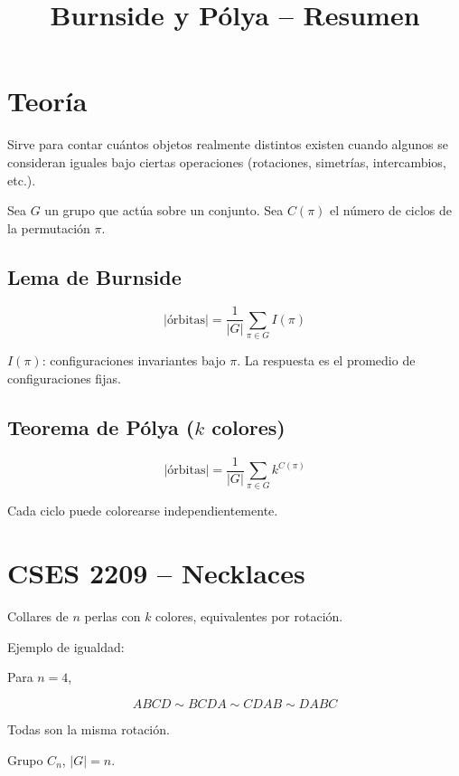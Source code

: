 \documentclass[10pt,twocolumn]{article}
\begin{document}
\title{\vspace{-0.5cm}Burnside y Pólya -- Resumen}
\date{}
\maketitle
\vspace{-0.5cm}

\section*{Teoría}

Sirve para contar cuántos objetos realmente distintos existen cuando
algunos se consideran iguales bajo ciertas operaciones
(rotaciones, simetrías, intercambios, etc.).

Sea \(G\) un grupo que actúa sobre un conjunto.
Sea \(C(\pi)\) el número de ciclos de la permutación \(\pi\).

\subsection*{Lema de Burnside}

\[
|\text{órbitas}| = \frac{1}{|G|}\sum_{\pi\in G} I(\pi)
\]

\(I(\pi)\): configuraciones invariantes bajo \(\pi\).  
La respuesta es el promedio de configuraciones fijas.

\subsection*{Teorema de Pólya ($k$ colores)}

\[
|\text{órbitas}| = \frac{1}{|G|}\sum_{\pi\in G} k^{C(\pi)}
\]

Cada ciclo puede colorearse independientemente.


\section*{CSES 2209 -- Necklaces}

Collares de \(n\) perlas con \(k\) colores,
equivalentes por rotación.

Ejemplo de igualdad:

Para \(n=4\),

\[
ABCD \sim BCDA \sim CDAB \sim DABC
\]

Todas son la misma rotación.

Grupo \(C_n\), \(|G| = n\).
\end{document}
